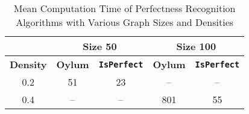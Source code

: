 \begin{table}[H]
\centering
\caption{Mean Computation Time of Perfectness Recognition Algorithms with Various Graph Sizes and Densities}
\label{tab:recognition}
\begin{tabular}{|c|cc|cc|}
\hline
        & \multicolumn{2}{c|}{\textbf{Size 50}}           & \multicolumn{2}{c|}{\textbf{Size 100}}          \\ \hline
\textbf{Density} & \multicolumn{1}{c|}{\textbf{Oylum}} & \textbf{\texttt{IsPerfect}} & \multicolumn{1}{c|}{\textbf{Oylum}} & \textbf{\texttt{IsPerfect}} \\ \hline
0.2     & \multicolumn{1}{c|}{51}    & 23        & \multicolumn{1}{c|}{--}    & --        \\ \hline
0.4     & \multicolumn{1}{c|}{--}    & --        & \multicolumn{1}{c|}{801}   & 55        \\ \hline
\end{tabular}
\end{table}